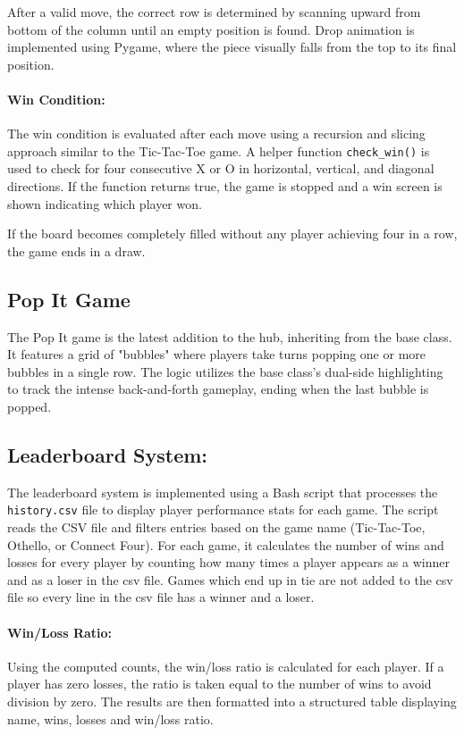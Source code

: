 \documentclass[12pt,a4paper]{article}
\begin{document}
After a valid move, the correct row is determined by scanning upward from bottom of the column until an empty position is found. Drop animation is implemented using Pygame, where the piece visually falls from the top to its final position.
\paragraph{Win Condition:}
The win condition is evaluated after each move using a recursion and slicing approach similar to the Tic-Tac-Toe game. A helper function \texttt{check\_win()} is used to check for four consecutive X or O in horizontal, vertical, and diagonal directions. If the function returns true, the game is stopped and a win screen is shown indicating which player won.

If the board becomes completely filled without any player achieving four in a row, the game ends in a draw.
\subsection{Pop It Game}
The Pop It game is the latest addition to the hub, inheriting from the base class. It features a grid of "bubbles" where players take turns popping one or more bubbles in a single row. The logic utilizes the base class's dual-side highlighting to track the intense back-and-forth gameplay, ending when the last bubble is popped.
\subsection{Leaderboard System:}
The leaderboard system is implemented using a Bash script that processes the \texttt{history.csv} file to display player performance stats for each game.
The script reads the CSV file and filters entries based on the game name (Tic-Tac-Toe, Othello, or Connect Four). For each game, it calculates the number of wins and losses for every player by counting how many times a player appears as a winner and as a loser in the csv file. Games which end up in tie are not added to the csv file so every line in the csv file has a winner and a loser.
\paragraph{Win/Loss Ratio:}
Using the computed counts, the win/loss ratio is calculated for each player. If a player has zero losses, the ratio is taken equal to the number of wins to avoid division by zero. The results are then formatted into a structured table displaying name, wins, losses and win/loss ratio.
\end{document}
